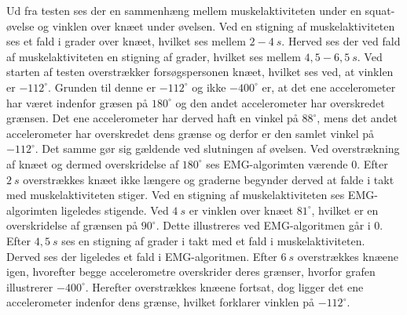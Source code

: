 Ud fra testen ses der en sammenhæng mellem muskelaktiviteten under en squat-øvelse og vinklen over knæet under øvelsen. Ved en stigning af muskelaktiviteten ses et fald i grader over knæet, hvilket ses mellem $2-4~s$. Herved ses der ved fald af muskelaktiviteten en stigning af grader, hvilket ses mellem $4,5-6,5~s$.
Ved starten af testen overstrækker forsøgspersonen knæet, hvilket ses ved, at vinklen er $-112^{\circ}$. Grunden til denne er $-112^{\circ}$ og ikke $-400^{\circ}$ er, at det ene accelerometer har været indenfor græsen på $180^{\circ}$ og den andet accelerometer har overskredet grænsen. Det ene accelerometer har derved haft en vinkel på $88^{\circ}$, mens det andet accelerometer har overskredet dens grænse og derfor er den samlet vinkel på $-112^{\circ}$. Det samme gør sig gældende ved slutningen af øvelsen. Ved overstrækning af knæet og dermed overskridelse af $180^{\circ}$ ses EMG-algorimten værende 0. 
Efter $2~s$ overstrækkes knæet ikke længere og graderne begynder derved at falde i takt med muskelaktiviteten stiger. Ved en stigning af muskelaktiviteten ses EMG-algorimten ligeledes stigende. Ved $4~s$ er vinklen over knæet $81^{\circ}$, hvilket er en overskridelse af grænsen på $90^{\circ}$. Dette illustreres ved EMG-algoritmen går i 0. 
Efter $4,5~s$ ses en stigning af grader i takt med et fald i muskelaktiviteten. Derved ses der ligeledes et fald i EMG-algoritmen. 
Efter $6~s$ overstrækkes knæene igen, hvorefter begge accelerometre overskrider deres grænser, hvorfor grafen illustrerer $-400^{\circ}$. Herefter overstrækkes knæene fortsat, dog ligger det ene accelerometer indenfor dens grænse, hvilket forklarer vinklen på $-112^{\circ}$. 
